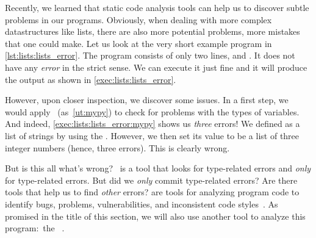 %
\label{sec:listExampleForErrorsAndRuff}%
%
%
%
%
%
%
%
\begin{sloppypar}%
Recently, we learned that static code analysis tools can help us to discover subtle problems in our programs.
Obviously, when dealing with more complex datastructures like lists, there are also more potential problems, more mistakes that one could make.
Let us look at the very short example program  in \cref{lst:lists:lists_error}.
The program consists of only two lines,  and .
It does not have any \emph{error} in the strict sense.
We can execute it just fine and it will produce the output \textil{[1, 2, 3]} as shown in \cref{exec:lists:lists_error}.%
\end{sloppypar}%
%
However, upon closer inspection, we discover some issues.
In a first step, we would apply \mypy~(as~\cref{ut:mypy}) to check for problems with the types of variables.
And indeed, \cref{exec:lists:lists_error:mypy} shows us \emph{three} errors!
We defined  as a list of strings by using the  .
However, we then set its value to be a list of three integer numbers (hence, three errors).
This is clearly wrong.

But is this all what's wrong?
\mypy~is a tool that looks for type-related errors and \emph{only} for type-related errors.
But did we \emph{only} commit type-related errors?
Are there tools that help us to find \emph{other} errors?
 are tools for analyzing program code to identify bugs, problems, vulnerabilities, and inconsistent code styles~\cite{J1978LACPC,RJYKK2022CULTDVM}.
As promised in the title of this section, we will also use another tool to analyze this program:~the ~\ruff.

